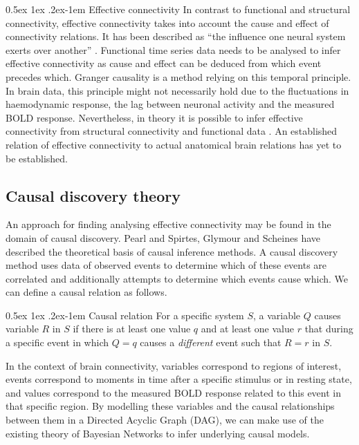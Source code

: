\documentclass[a4paper, english]{article}
\makeatletter
\renewcommand{\paragraph}{%
  \@startsection{paragraph}{4}%
  {\z@}{0.5ex \@plus 1ex \@minus .2ex}{-1em}%
  {\normalfont\normalsize\bfseries}%
}
\makeatother
\begin{document}
\paragraph{Effective connectivity}
In contrast to functional and structural connectivity, effective connectivity takes into account the cause and effect of connectivity relations.
It has been described as ``the influence one neural system exerts over another'' \cite{friston1994}.
Functional time series data needs to be analysed to infer effective connectivity as cause and effect can be deduced from which event precedes which.
Granger causality is a method relying on this temporal principle.
In brain data, this principle might not necessarily hold due to the fluctuations in haemodynamic response, the lag between neuronal activity and the measured BOLD response.
Nevertheless, in theory it is possible to infer effective connectivity from structural connectivity and functional data \cite{mclntosh1994, harrison2003, friston2003, roebroeck2005}.
An established relation of effective connectivity to actual anatomical brain relations has yet to be established.

\subsection{Causal discovery theory}
An approach for finding analysing effective connectivity may be found in the domain of causal discovery.
Pearl\cite{pearl2000causality} and Spirtes, Glymour and Scheines\cite{spirtes2000} have described the theoretical basis of causal inference methods.
A causal discovery method uses data of observed events to determine which of these events are correlated and additionally attempts to determine which events cause which.
We can define a causal relation as follows.

\paragraph{Causal relation}
For a specific system $S$, a variable $Q$ causes variable $R$ in $S$ if there is at least one value $q$ and at least one value $r$ that during a specific event in which $Q=q$ causes a \textit{different} event such that $R = r$ in $S$\cite[p.21]{spirtes2000}.

In the context of brain connectivity, variables correspond to regions of interest, events correspond to moments in time after a specific stimulus or in resting state, and values correspond to the measured BOLD response related to this event in that specific region.
By modelling these variables and the causal relationships between them in a Directed Acyclic Graph (DAG), we can make use of the existing theory of Bayesian Networks to infer underlying causal models.
\end{document}
